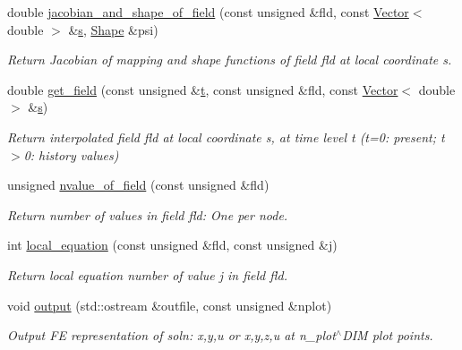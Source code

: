 \begin{DoxyCompactItemize}
double \hyperlink{classoomph_1_1ProjectablePMLHelmholtzElement_aa4af5bb878fed3d1b286bde1da0f5419}{jacobian\+\_\+and\+\_\+shape\+\_\+of\+\_\+field} (const unsigned \&fld, const \hyperlink{classoomph_1_1Vector}{Vector}$<$ double $>$ \&\hyperlink{cfortran_8h_ab7123126e4885ef647dd9c6e3807a21c}{s}, \hyperlink{classoomph_1_1Shape}{Shape} \&psi)
\begin{DoxyCompactList}\small\item\em Return Jacobian of mapping and shape functions of field fld at local coordinate s. \end{DoxyCompactList}\item 
double \hyperlink{classoomph_1_1ProjectablePMLHelmholtzElement_a14a5a245ec1fa36c371a3937a3fb4e96}{get\+\_\+field} (const unsigned \&\hyperlink{cfortran_8h_af6f0bd3dc13317f895c91323c25c2b8f}{t}, const unsigned \&fld, const \hyperlink{classoomph_1_1Vector}{Vector}$<$ double $>$ \&\hyperlink{cfortran_8h_ab7123126e4885ef647dd9c6e3807a21c}{s})
\begin{DoxyCompactList}\small\item\em Return interpolated field fld at local coordinate s, at time level t (t=0\+: present; t$>$0\+: history values) \end{DoxyCompactList}\item 
unsigned \hyperlink{classoomph_1_1ProjectablePMLHelmholtzElement_a08c9eee991edbaff38b8df1682e49a8e}{nvalue\+\_\+of\+\_\+field} (const unsigned \&fld)
\begin{DoxyCompactList}\small\item\em Return number of values in field fld\+: One per node. \end{DoxyCompactList}\item 
int \hyperlink{classoomph_1_1ProjectablePMLHelmholtzElement_aaa23dc2e79e4185e5ee8665cd69ecc8d}{local\+\_\+equation} (const unsigned \&fld, const unsigned \&j)
\begin{DoxyCompactList}\small\item\em Return local equation number of value j in field fld. \end{DoxyCompactList}\item 
void \hyperlink{classoomph_1_1ProjectablePMLHelmholtzElement_afc31f9a26ca4d6ac5089ef430139c380}{output} (std\+::ostream \&outfile, const unsigned \&nplot)
\begin{DoxyCompactList}\small\item\em Output FE representation of soln\+: x,y,u or x,y,z,u at n\+\_\+plot$^\wedge$\+D\+IM plot points. \end{DoxyCompactList}\end{DoxyCompactItemize}
